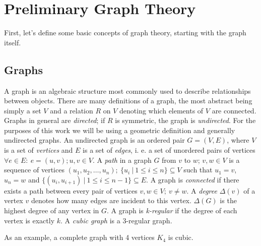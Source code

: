 \chapter{Preliminary Graph Theory}\label{ch:prelim}

First, let's define some basic concepts of graph theory, starting with the graph itself.

\section{Graphs}

A graph is an algebraic structure most commonly used to describe relationships between objects. There are many definitions of a graph, the most abstract being simply a set $V$ and a relation $R$ on $V$ denoting which elements of $V$ are connected. Graphs in general are \textit{directed}; if $R$ is symmetric, the graph is \textit{undirected}. For the purposes of this work we will be using a geometric definition and generally undirected graphs.
An undirected graph is an ordered pair $G = (V, E)$, where $V$ is a set of \textit{vertices} and $E$ is a set of \textit{edges}, i. e. a set of unordered pairs of vertices $\forall e \in E: ~ e = (u,v); u,v \in V$.
A \textit{path} in a graph $G$ from $v$ to $w$; $v,w \in V$ is a sequence of vertices $(u_1, u_2, \dots, u_n); ~ \{u_i ~|~ 1 \leq i \leq n\} \subseteq V$ such that $u_1 = v$, $u_n = w$ and $\{(u_i, u_{i+1}) ~|~ 1 \leq i \leq n-1\} \subseteq E$. A graph is \textit{connected} if there exists a path between every pair of vertices $v,w \in V; ~ v \neq w$.
A \textit{degree} $\Delta (v)$ of a vertex $v$ denotes how many edges are incident to this vertex. $\Delta(G)$ is the highest degree of any vertex in $G$.
A graph is \textit{k-regular} if the degree of each vertex is exactly $k$. A \textit{cubic graph} is a 3-regular graph.

As an example, a complete graph with 4 vertices $K_4$ is cubic.

\begin{figure}[h]
    \centering
\end{figure}

